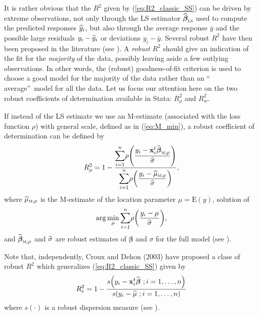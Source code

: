 It is rather obvious that the $R^{2}$ given by (\ref{eq:R2_classic_SS}) can be
driven by extreme observations, not only through the LS estimator
$\sthat{\boldsymbol\beta}_{\stsc{LS}}$ used to compute the predicted
responses $\widehat{y}_{i}$, but also through the average response
$\overline{y}$ and the possible large residuals $y_{i}-\widehat{y}_{i}$ or
deviations $y_{i}-\overline{y}$. Several robust $R^{2}$ have then been
proposed in the literature (see \citealp{Renaud:2010}). A
\emph{robust} $R^{2}$ should give an indication of the fit for the 
\emph{majority} of the data, possibly leaving aside a few outlying observations. In
other words, the (robust) goodness-of-fit criterion is used to choose a good
model for the majority of the data rather than an \textquotedblleft
average\textquotedblright\ model for all the data. Let us focus our attention
here on the two robust coefficients of determination available in Stata:
$R_{\rho}^{2}$ and $R_{w}^{2}$.

If instead of the LS estimate we use an M-estimate (associated with the loss
function $\rho$) with general scale, defined as in (\ref{eq:M_min}), a robust
coefficient of determination can be defined by
\begin{equation}
R_{\rho}^{2}=1-\frac{%
{\displaystyle\sum\limits_{i=1}^{n}}
\rho\left(  \dfrac{y_{i}-\stvec{x}_{i}^{t}\sthat{\boldsymbol\beta%
}_{\stsc{M};\rho}}{\sthat{\sigma}}\right)  }{%
{\displaystyle\sum\limits_{i=1}^{n}}
\rho\left(  \dfrac{y_{i}-\sthat{\mu}_{\stsc{M};\rho}}{\sthat{\sigma}%
}\right)  }, \label{eq:R2_rho}%
\end{equation}
where $\sthat{\mu}_{\stsc{M};\rho}$ is the M-estimate of the location
parameter $\mu=\mathrm{E}(y)$, solution of
\[
\arg\min_{\mu}%
{\displaystyle\sum\limits_{i=1}^{n}}
\rho\left(  \dfrac{y_{i}-\mu}{\sthat{\sigma}}\right)  ,
\]
and $\sthat{\boldsymbol\beta}_{\stsc{M};\rho}$ and $\widehat{\sigma}$
are robust estimates of $\boldsymbol\beta$ and $\sigma$ for the full model
(see \citealp{maronna:etal:2006}).

Note that, independently, Croux and Dehon (2003) have proposed a class of
robust $R^{2}$ which generalizes (\ref{eq:R2_classic_SS}) given by
\begin{equation}
R_{\stsc{S}}^{2}=1-\frac{s\left(  y_{i}-\stvec{x}_{i}^{t}\widehat
{\boldsymbol\beta}\ ;i = 1, \dots, n\right)  }{s\left(  y_{i}-\sthat{\mu
}\ ;i = 1, \dots, n\right)  } \label{eq:R2_S}%
\end{equation}
where $s\left(  \cdot\right)  $ is a robust dispersion measure (see
\citealp{croux:dehon:2003}).


